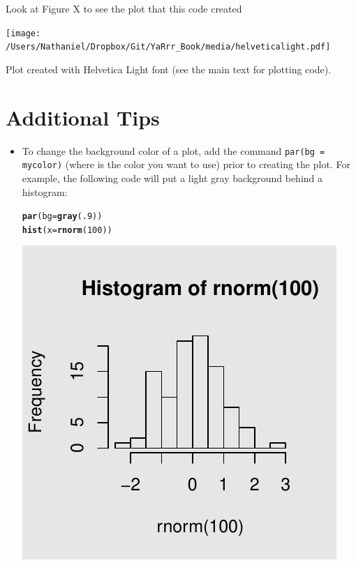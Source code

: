 \documentclass{tufte-book}\usepackage[]{graphicx}\usepackage[]{color}
\makeatletter
\def\maxwidth{ %
  \ifdim\Gin@nat@width>\linewidth
    \linewidth
  \else
    \Gin@nat@width
  \fi
}
\newcommand{\hlnum}[1]{\textcolor[rgb]{0.686,0.059,0.569}{#1}}%
\newcommand{\hlstd}[1]{\textcolor[rgb]{0.345,0.345,0.345}{#1}}%
\newcommand{\hlkwc}[1]{\textcolor[rgb]{0.333,0.667,0.333}{#1}}%
\newcommand{\hlkwd}[1]{\textcolor[rgb]{0.737,0.353,0.396}{\textbf{#1}}}%
\newenvironment{kframe}{%
 \def\at@end@of@kframe{}%
 \ifinner\ifhmode%
  \def\at@end@of@kframe{\end{minipage}}%
  \begin{minipage}{\columnwidth}%
 \fi\fi%
 \def\FrameCommand##1{\hskip\@totalleftmargin \hskip-\fboxsep
 \colorbox{shadecolor}{##1}\hskip-\fboxsep
     \hskip-\linewidth \hskip-\@totalleftmargin \hskip\columnwidth}%
 \MakeFramed {\advance\hsize-\width
   \@totalleftmargin\z@ \linewidth\hsize
   \@setminipage}}%
 {\par\unskip\endMakeFramed%
 \at@end@of@kframe}
\newenvironment{knitrout}{}{} %
\makeatother
\begin{document}
\begin{footnotesize}
Look at Figure X to see the plot that this code created

\begin{marginfigure}
\texttt{[image: /Users/Nathaniel/Dropbox/Git/YaRrr\_Book/media/helveticalight.pdf]}
\caption{Plot created with Helvetica Light font (see the main text for plotting code).}
\label{fig:helvetica}
\end{marginfigure}


\pagebreak
\section{Additional Tips}

\begin{itemize}


  \item To change the background color of a plot, add the command \texttt{par(bg = mycolor)} (where  is the color you want to use) prior to creating the plot. For example, the following code will put a light gray background behind a histogram:
  
\begin{knitrout}
\color{fgcolor}\begin{kframe}
\begin{alltt}
\hlkwd{par}\hlstd{(}\hlkwc{bg} \hlstd{=} \hlkwd{gray}\hlstd{(}\hlnum{.9}\hlstd{))}
\hlkwd{hist}\hlstd{(}\hlkwc{x} \hlstd{=} \hlkwd{rnorm}\hlstd{(}\hlnum{100}\hlstd{))}
\end{alltt}
\end{kframe}
\includegraphics[width=\maxwidth]{figure/unnamed-chunk-193-1} 


\end{knitrout}
\end{itemize}
\end{footnotesize}
\end{document}
